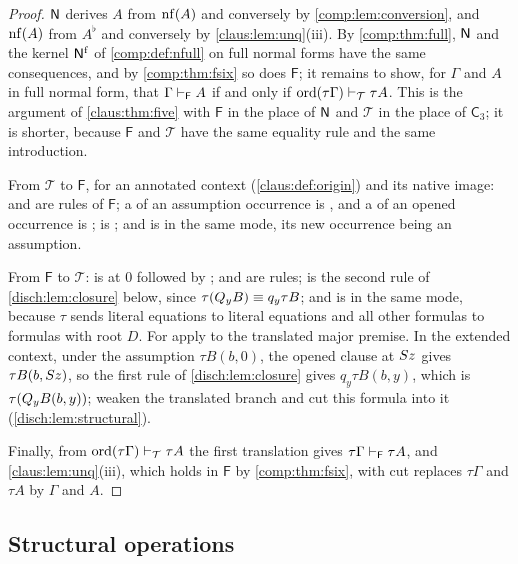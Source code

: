 \begin{proof}
$\mathsf{N}$ derives $A$ from $\operatorname{nf}(A)$ and conversely by
\cref{comp:lem:conversion}, and $\operatorname{nf}(A)$ from $A^\flat$ and conversely by
\cref{claus:lem:unq}(iii). By \cref{comp:thm:full}, $\mathsf{N}$ and the kernel
$\mathsf{N}^{\mathrm f}$ of \cref{comp:def:nfull} on full normal forms have the
same consequences, and by \cref{comp:thm:fsix} so does $\mathsf F$; it
remains to show, for
$\Gamma$ and $A$ in full normal form, that $\Gamma\vdash_{\mathsf F}A$ if
and only if $\operatorname{ord}(\tau\Gamma)\vdash_{\mathcal T}\tau A$.
This is the argument of \cref{claus:thm:five} with $\mathsf F$ in the
place of $\mathsf{N}$ and $\mathcal T$ in the place of $\mathsf C_3$; it is
shorter, because $\mathsf F$ and $\mathcal T$ have the same equality rule
and the same introduction.

From $\mathcal T$ to $\mathsf F$, for an annotated context
(\cref{claus:def:origin}) and its native image:  and
 are rules of $\mathsf F$; a  of an assumption
occurrence is , and a  of an opened occurrence
is ;  is ; and 
is  in the same mode, its new occurrence being an assumption.

From $\mathsf F$ to $\mathcal T$:  is  at $0$
followed by ;  and  are rules;
 is the second rule of \cref{disch:lem:closure} below, since
$\tau(Q_{y}B)\equiv q_y\tau B$; and  is  in
the same mode, because $\tau$ sends literal equations to literal equations
and all other formulas to formulas with root $D$. For  apply
 to the translated major premise. In the extended context,
under the assumption $\tau B(b,0)$, the opened clause at $S z$ gives
$\tau B(b,S z)$, so the first rule of \cref{disch:lem:closure} gives
$q_y\tau B(b,y)$, which is $\tau(Q_{y}B(b,y))$; weaken the translated
branch and cut this formula into it (\cref{disch:lem:structural}).

Finally, from $\operatorname{ord}(\tau\Gamma)\vdash_{\mathcal T}\tau A$
the first translation gives $\tau\Gamma\vdash_{\mathsf F}\tau A$, and
\cref{claus:lem:unq}(iii), which holds in $\mathsf F$ by
\cref{comp:thm:fsix}, with cut replaces $\tau\Gamma$ and $\tau A$ by
$\Gamma$ and $A$.
\end{proof}

\subsection{Structural operations}

